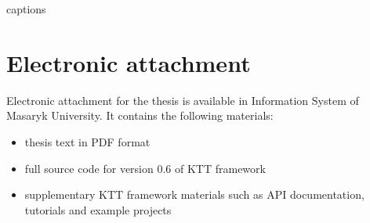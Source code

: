 \documentclass
[
    digital, %
    oneside, %
    table, %
    nolof, %
    nolot, %
    nocover %
]{fithesis3}
\begin{document}
\csname captions\languagename\endcsname
\makeatletter
\thesis@selectLocale{\thesis@locale}\makeatother
\printbibliography[heading=bibintoc]

\appendix
\chapter{Electronic attachment}
Electronic attachment for the thesis is available in Information System of Masaryk University. It contains the following materials:
\begin{itemize}
    \item thesis text in PDF format
    \item full source code for version 0.6 of KTT framework
    \item supplementary KTT framework materials such as API documentation, tutorials and example projects
\end{itemize}
\end{document}
